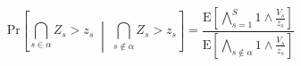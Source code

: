 \begin{comment}
    \begin{itemize}
        \item Description of joint maxima problem/application
        \item Extremal dependence
        \begin{itemize}
            \item Following the example of \cite{trubey:pg}, ...
        \end{itemize}
        \item Multi-site return levels
        \begin{itemize}
            \item Using 
        \end{itemize}
        \item Application results
    \end{itemize}
\end{comment}


\begin{equation}
    \text{Pr}\left[\bigcap_{s\in\alpha}Z_s > z_s\;\middle|\;\bigcap_{s\not\in\alpha}Z_s > z_s\right] =
    \frac{
        \text{E}\left[\bigwedge_{s=1}^S 1\wedge \frac{V_s}{z_s}\right]
    }{
        \text{E}\left[\bigwedge_{s\not\in\alpha} 1\wedge \frac{V_s}{z_s}\right]
    }    
\end{equation}






